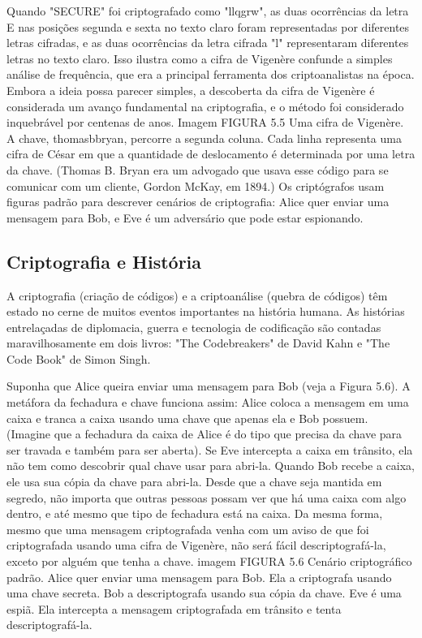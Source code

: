 \documentclass{book}
\begin{document}
Quando "SECURE" foi criptografado como "llqgrw", as duas ocorrências da letra E nas posições segunda e sexta no texto claro foram representadas por diferentes letras cifradas, e as duas ocorrências da letra cifrada "l" representaram diferentes letras no texto claro. Isso ilustra como a cifra de Vigenère confunde a simples análise de frequência, que era a principal ferramenta dos criptoanalistas na época. Embora a ideia possa parecer simples, a descoberta da cifra de Vigenère é considerada um avanço fundamental na criptografia, e o método foi considerado inquebrável por centenas de anos.
Imagem
FIGURA 5.5 Uma cifra de Vigenère. A chave, thomasbbryan, percorre a segunda coluna. Cada linha representa uma cifra de César em que a quantidade de deslocamento é determinada por uma letra da chave. (Thomas B. Bryan era um advogado que usava esse código para se comunicar com um cliente, Gordon McKay, em 1894.)
Os criptógrafos usam figuras padrão para descrever cenários de criptografia: Alice quer enviar uma mensagem para Bob, e Eve é um adversário que pode estar espionando.


\subsection{Criptografia e História}
\label{segredos:crip-his}

A criptografia (criação de códigos) e a criptoanálise (quebra de códigos) têm estado no cerne de muitos eventos importantes na história humana. As histórias entrelaçadas de diplomacia, guerra e tecnologia de codificação são contadas maravilhosamente em dois livros: "The Codebreakers" de David Kahn e "The Code Book" de Simon Singh.

Suponha que Alice queira enviar uma mensagem para Bob (veja a Figura 5.6). A metáfora da fechadura e chave funciona assim: Alice coloca a mensagem em uma caixa e tranca a caixa usando uma chave que apenas ela e Bob possuem. (Imagine que a fechadura da caixa de Alice é do tipo que precisa da chave para ser travada e também para ser aberta). Se Eve intercepta a caixa em trânsito, ela não tem como descobrir qual chave usar para abri-la. Quando Bob recebe a caixa, ele usa sua cópia da chave para abri-la. Desde que a chave seja mantida em segredo, não importa que outras pessoas possam ver que há uma caixa com algo dentro, e até mesmo que tipo de fechadura está na caixa. Da mesma forma, mesmo que uma mensagem criptografada venha com um aviso de que foi criptografada usando uma cifra de Vigenère, não será fácil descriptografá-la, exceto por alguém que tenha a chave.
imagem
FIGURA 5.6 Cenário criptográfico padrão. Alice quer enviar uma mensagem para Bob. Ela a criptografa usando uma chave secreta. Bob a descriptografa usando sua cópia da chave. Eve é uma espiã. Ela intercepta a mensagem criptografada em trânsito e tenta descriptografá-la.
\end{document}
